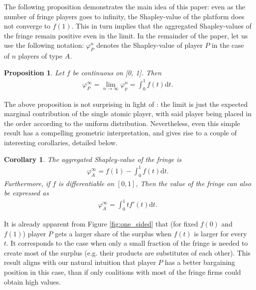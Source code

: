 \documentclass[a4paper]{article}
\newtheorem{proposition}{Proposition}
\newtheorem{corollary}{Corollary}
\newcommand{\dt}{\mathrm{d}t}
\begin{document}
The following proposition demonstrates the main idea of this paper: even as the number of fringe players goes to infinity, the Shapley-value of the platform does not converge to $f(1)$. This in turn implies that the aggregated Shapley-values of the fringe remain positive even in the limit. In the remainder of the paper, let us use the following notation: $\varphi_P^n$ denotes the Shapley-value of player $P$ in the case of $n$ players of type $A$.
\begin{proposition}
    \label{prop:one_sided}
    Let $f$ be continuous on [0, 1]. Then
    \begin{align*}
        \varphi_P^\infty = \lim_{n \to \infty} \varphi_p^n = \int_0^1 f(t) \dt .
    \end{align*}
\end{proposition}

The above proposition is not surprising in light of \textcite{fogelman1980asymptotic}: the limit is just the expected marginal contribution of the single atomic player, with said player being placed in the order according to the uniform distribution. Nevertheless, even this simple result has a compelling geometric interpretation, and gives rise to a couple of interesting corollaries, detailed below.

\begin{corollary}
    \label{cor:fringe_value}
    The aggregated Shapley-value of the fringe is
    \begin{align*}
        \varphi_A^\infty = f(1) - \int_0^1 f(t) \dt.
    \end{align*}
    Furthermore, if $f$ is differentiable on $[0, 1]$, Then the value of the fringe can also be expressed as
    \begin{align*}
        \varphi_A^\infty = \int_0^1 t f'(t) \dt.
    \end{align*}
\end{corollary}

It is already apparent from Figure \ref{fig:one_sided} that (for fixed $f(0)$ and $f(1)$) player $P$ gets a larger share of the surplus when $f(t)$ is larger for every $t$. It corresponds to the case when only a small fraction of the fringe is needed to create most of the surplus (e.g. their products are substitutes of each other). This result aligns with our natural intuition that player $P$ has a better bargaining position in this case, than if only coalitions with most of the fringe firms could obtain high values.
\end{document}
